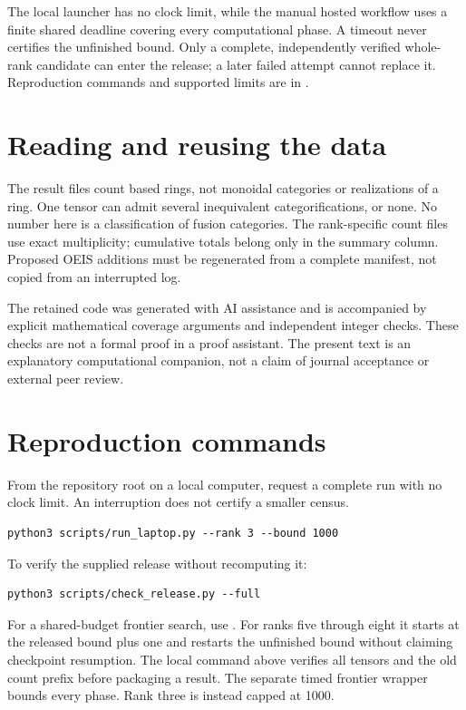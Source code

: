 \documentclass[11pt,a4paper]{article}
\theoremstyle{definition}\newtheorem{definition}[theorem]{Definition}\newtheorem{remark}[theorem]{Remark}
\begin{document}
The local launcher has no clock limit, while the manual hosted workflow uses a
finite shared deadline covering every computational phase. A timeout never
certifies the unfinished bound. Only a complete, independently verified whole-rank
candidate can enter the release; a later failed attempt cannot replace it.
Reproduction commands and supported limits are in .

\section{Reading and reusing the data}
The result files count based rings, not monoidal categories or realizations of
a ring. One tensor can admit several inequivalent categorifications, or none.
No number here is a classification of fusion categories. The rank-specific
count files use exact multiplicity; cumulative totals belong only in the
summary column. Proposed OEIS additions must be regenerated from a complete
manifest, not copied from an interrupted log.

The retained code was generated with AI assistance and is accompanied by explicit
mathematical coverage arguments and independent integer checks. These checks
are not a formal proof in a proof assistant. The present text is an explanatory
computational companion, not a claim of journal acceptance or external peer review.

\par\noindent\begin{minipage}{\linewidth}
\section{Reproduction commands}
From the repository root on a local computer, request a complete run with no clock limit. An interruption does not certify a smaller census.
\par\noindent\begin{minipage}{\linewidth}
\begin{lstlisting}
python3 scripts/run_laptop.py --rank 3 --bound 1000
\end{lstlisting}
\end{minipage}\par
To verify the supplied release without recomputing it:
\par\noindent\begin{minipage}{\linewidth}
\begin{lstlisting}
python3 scripts/check_release.py --full
\end{lstlisting}
\end{minipage}\par
For a shared-budget frontier search, use . For ranks five through eight it starts at the released bound plus one and restarts the unfinished bound without claiming checkpoint resumption. The local command above verifies all tensors and the old count prefix before packaging a result. The separate timed frontier wrapper bounds every phase. Rank three is instead capped at 1000.

\end{minipage}\par
\end{document}
